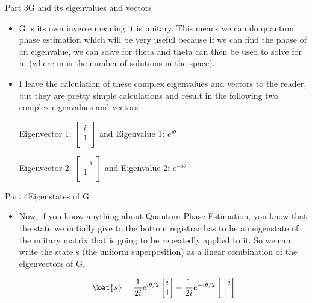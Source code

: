 \begin{frame}{Part 3}{G and its eigenvalues and vectors}
\begin{itemize}
    \item G is its own inverse meaning it is unitary. This means we can do quantum phase estimation which will be very useful because if we can find the phase of an eigenvalue, we can solve for theta and theta can then be used to solve for m (where m is the number of solutions in the space).
    \item I leave the calculation of these complex eigenvalues and vectors to the reader, but they are pretty simple calculations and result in the following two complex eigenvalues and vectors

    \begin{center}

    Eigenvector 1: $\begin{bmatrix}i\\1\\\end{bmatrix}$ and Eigenvalue 1: $e^{i\theta}$

    Eigenvector 2: $\begin{bmatrix}-i\\1\\\end{bmatrix}$ and Eigenvalue 2: $e^{-i\theta}$

        
    \end{center}

\end{itemize}
\end{frame}





\begin{frame}{Part 4}{Eigenstates of G}
\begin{itemize}
    \item Now, if you know anything about Quantum Phase Estimation, you know that the state we initially give to the bottom registrar has to be an eigenstate of the unitary matrix that is going to be repeatedly applied to it. So we can write the state s (the uniform superposition) as a linear combination of the eigenvectors of G.

    $$\ket{s} = \dfrac{1}{2i}e^{i\theta/2}\begin{bmatrix}i\\1\\\end{bmatrix} - \dfrac{1}{2i}e^{-i\theta/2}\begin{bmatrix}-i\\1\\\end{bmatrix}$$



\end{itemize}
\end{frame}







